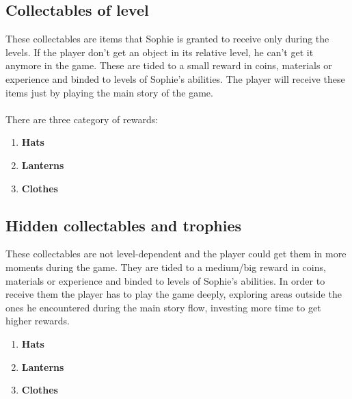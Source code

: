 \subsection{Collectables of level}
These collectables are items that Sophie is granted to receive only during the levels. If the player don't get an object in its relative level, he can't get it anymore in the game.
These are tided to a small reward in coins, materials or experience and binded to levels of Sophie's abilities.
The player will receive these items just by playing the main story of the game.\\\\
There are three category of rewards:
\begin{enumerate}
\item \textbf{Hats}\\
  
\item \textbf{Lanterns}\\
  
\item \textbf{Clothes}\\
  
\end{enumerate}


\subsection{Hidden collectables and trophies}
These collectables are not level-dependent and the player could get them in more moments during the game. They are tided to a medium/big reward in coins, materials or experience and binded to levels of Sophie's abilities. In order to receive them the player has to play the game deeply, exploring areas outside the ones he encountered during the main story flow, investing more time to get higher rewards.
\begin{enumerate}
\item \textbf{Hats}\\
  
\item \textbf{Lanterns}\\
  
\item \textbf{Clothes}\\
  
\end{enumerate}


